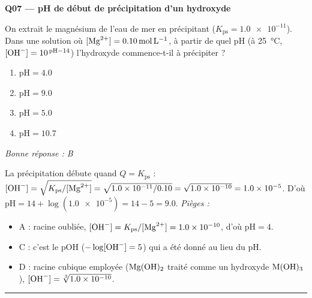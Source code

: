 \documentclass[11pt,a4paper]{article}
\begin{document}
\noindent\textbf{Q07 --- pH de début de précipitation d'un hydroxyde}\par
On extrait le magnésium de l'eau de mer en précipitant  ($K_{\mathrm{ps}} = \num{1.0e-11}$).
Dans une solution où $[\ce{Mg^{2+}}] = \qty{0.10}{\mole\per\litre}$, à partir de quel pH (à \qty{25}{\degreeCelsius},
$[\ce{OH-}] = 10^{\,\mathrm{pH}-14}$) l'hydroxyde commence-t-il à précipiter ?
\begin{enumerate}[label=\Alph*)]
\item $\mathrm{pH} = \num{4.0}$
\item $\mathrm{pH} = \num{9.0}$
\item $\mathrm{pH} = \num{5.0}$
\item $\mathrm{pH} = \num{10.7}$
\end{enumerate}
\textit{Bonne réponse : B}\par
La précipitation débute quand $Q = K_{\mathrm{ps}}$ : $[\ce{OH-}] = \sqrt{K_{\mathrm{ps}}/[\ce{Mg^{2+}}]} = \sqrt{\num{1.0e-11}/\num{0.10}} = \sqrt{\num{1.0e-10}} = \num{1.0e-5}$.
D'où $\mathrm{pH} = 14 + \log(\num{1.0e-5}) = 14 - 5 = \num{9.0}$.
\textit{Pièges :}
\begin{itemize}
\item A : racine oubliée, $[\ce{OH-}] = K_{\mathrm{ps}}/[\ce{Mg^{2+}}] = \num{1.0e-10}$, d'où $\mathrm{pH} = 4$.
\item C : c'est le pOH ($-\log[\ce{OH-}] = 5$) qui a été donné au lieu du pH.
\item D : racine cubique employée ($\ce{Mg(OH)2}$ traité comme un hydroxyde $\ce{M(OH)3}$), $[\ce{OH-}] = \sqrt[3]{\num{1.0e-10}}$.
\end{itemize}
\vspace{6pt}\hrule\vspace{8pt}
\end{document}
